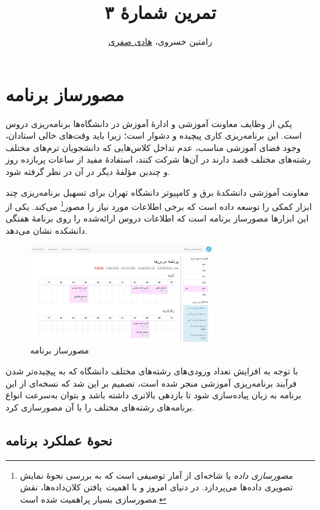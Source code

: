 \documentclass{utap}
\title{تمرین شمارهٔ ۳}
\author{رامتین خسروی، \href{mailto:info@hadisafari.ir?subject=[AP\%20S98 A1]\%20}{هادی صفری}}
\begin{document}
    \maketitle

    \section{مصورساز برنامه}

    یکی از وظایف معاونت آموزشی و ادارهٔ آموزش در دانشگاه‌ها برنامه‌ریزی دروس است. این برنامه‌ریزی کاری پیچیده و دشوار است؛ زیرا باید وقت‌های خالی استادان، وجود فضای آموزشی مناسب، عدم تداخل کلاس‌هایی که دانشجویان ترم‌های مختلف رشته‌های مختلف قصد دارند در آن‌ها شرکت کنند، استفادهٔ مفید از ساعات پربازده روز و چندین مؤلفهٔ دیگر در آن در نظر گرفته شود.

    معاونت آموزشی دانشکدهٔ برق و کامپیوتر دانشگاه تهران برای تسهیل برنامه‌ریزی چند ابزار کمکی را توسعه داده است که برخی اطلاعات مورد نیاز را مصور\footnote{\textit{مصورسازی داده} یا  شاخه‌ای از آمار توصیفی است که به بررسی نحوهٔ نمایش تصویری داده‌ها می‌پردازد. در دنیای امروز و با اهمیت~یافتن کلان‌داده‌ها، نقش مصورسازی بسیار پراهمیت شده است.} می‌کند. یکی از این ابزارها مصورساز برنامه است که اطلاعات دروس ارائه‌شده را روی برنامهٔ هفتگی دانشکده نشان می‌دهد.

    \begin{figure}[hb]
        \centering
        \includegraphics[width=0.7\textwidth]{webversion.png}
        \caption{مصورساز برنامه}
    \end{figure}

    با توجه به افزایش تعداد ورودی‌های رشته‌های مختلف دانشگاه که به پیچیده‌تر شدن فرآیند برنامه‌ریزی آموزشی منجر شده است، تصمیم بر این شد که نسخه‌ای از این برنامه به زبان  پیاده‌سازی شود تا بازدهی بالاتری داشته باشد و بتوان به‌سرعت انواع برنامه‌های رشته‌های مختلف را با آن مصورسازی کرد.

    \subsection{نحوهٔ عملکرد برنامه}
\end{document}
